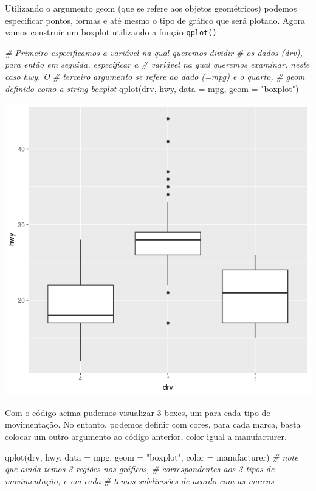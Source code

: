 \documentclass[
]{book}
\newenvironment{Shaded}{\begin{snugshade}}{\end{snugshade}}
\newcommand{\AttributeTok}[1]{\textcolor[rgb]{0.77,0.63,0.00}{#1}}
\newcommand{\CommentTok}[1]{\textcolor[rgb]{0.56,0.35,0.01}{\textit{#1}}}
\newcommand{\FunctionTok}[1]{\textcolor[rgb]{0.00,0.00,0.00}{#1}}
\newcommand{\NormalTok}[1]{#1}
\newcommand{\StringTok}[1]{\textcolor[rgb]{0.31,0.60,0.02}{#1}}
\begin{document}
Utilizando o argumento geom (que se refere aos objetos geométricos) podemos especificar pontos, formas e até mesmo o tipo de gráfico que será plotado. Agora vamos construir um boxplot utilizando a função \texttt{qplot()}.

\begin{Shaded}
\begin{Highlighting}[]
\CommentTok{\# Primeiro especificamos a variável na qual queremos dividir}
\CommentTok{\# os dados (drv), para então em seguida, especificar a}
\CommentTok{\# variável na qual queremos examinar, neste caso hwy. O}
\CommentTok{\# terceiro argumento se refere ao dado (=mpg) e o quarto,}
\CommentTok{\# geom definido como a string \textquotesingle{}boxplot\textquotesingle{}}
\FunctionTok{qplot}\NormalTok{(drv, hwy, }\AttributeTok{data =}\NormalTok{ mpg, }\AttributeTok{geom =} \StringTok{"boxplot"}\NormalTok{)}
\end{Highlighting}
\end{Shaded}

\includegraphics{figure/g14.png}

Com o código acima pudemos visualizar 3 boxes, um para cada tipo de movimentação. No entanto, podemos definir com cores, para cada marca, basta colocar um outro argumento ao código anterior, color igual a manufacturer.

\begin{Shaded}
\begin{Highlighting}[]
\FunctionTok{qplot}\NormalTok{(drv, hwy, }\AttributeTok{data =}\NormalTok{ mpg, }\AttributeTok{geom =} \StringTok{"boxplot"}\NormalTok{, }\AttributeTok{color =}\NormalTok{ manufacturer)}
\CommentTok{\# note que ainda temos 3 regiões nos gráficos,}
\CommentTok{\# correspondentes aos 3 tipos de movimentação, e em cada}
\CommentTok{\# temos subdivisões de acordo com as marcas}
\end{Highlighting}
\end{Shaded}
\end{document}
